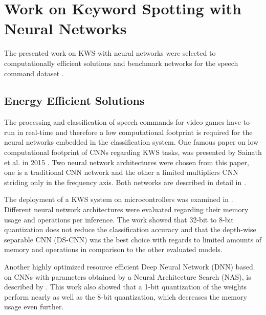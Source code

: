 
\section{Work on Keyword Spotting with Neural Networks}\label{sec:prev_kws}
The presented work on KWS with neural networks were selected to computationally efficient solutions and benchmark networks for the speech command dataset \cite{Warden2018}.



\subsection{Energy Efficient Solutions}
The processing and classification of speech commands for video games have to run in real-time and therefore a low computational footprint is required for the neural networks embedded in the classification system.
One famous paper on low computational footprint of CNNs regarding KWS tasks, was presented by Sainath et al. in 2015 \cite{Sainath2015}.
Two neural network architectures were chosen from this paper, one is a traditional CNN network and the other a limited multipliers CNN striding only in the frequency axis.
Both networks are described in detail in .

The deployment of a KWS system on microcontrollers was examined in \cite{Zhang2017}.
Different neural network architectures were evaluated regarding their memory usage and operations per inference.
The work showed that 32-bit to 8-bit quantization does not reduce the classification accuracy and that the depth-wise separable CNN (DS-CNN) was the best choice with regards to limited amounts of memory and operations in comparison to the other evaluated models.

Another highly optimized resource efficient Deep Neural Network (DNN) based on CNNs with parameters obtained by a Neural Architecture Search (NAS), is described by \cite{Peter2020}.
This work also showed that a 1-bit quantization of the weights perform nearly as well as the 8-bit quantization, which decreases the memory usage even further.



